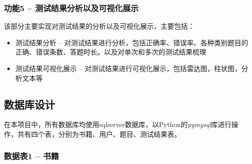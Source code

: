 \documentclass[twoside,11pt]{article}
\begin{document}
\vspace{0.6cm}

\subsubsection{功能5 -- 测试结果分析以及可视化展示}
该部分主要实现对测试结果的分析以及可视化展示，主要包括：
\begin{itemize}
    \item 测试结果分析 -- 对测试结果进行分析，包括正确率、错误率、各种类别题目的正确、错误条数、答题时长。以及对单次和多次的测试结果梳理
    \item 测试结果可视化展示 -- 对测试结果进行可视化展示，包括雷达图，柱状图，分析文本等
\end{itemize}
\vspace{0.6cm}
\subsection{数据库设计}

在本项目中，所有数据库均使用sqlserver数据库，以Python的\emph{pymysql}库进行操作，共有四个表，分别为书籍、用户、题目、测试结果表。
\vspace{0.6cm}
\subsubsection{数据表1 -- 书籍}
\end{document}
